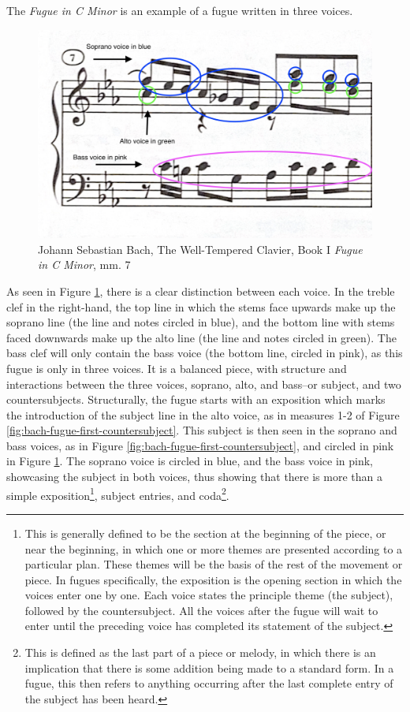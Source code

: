 The \textit{Fugue in C Minor} is an example of a fugue written in three voices.
\begin{figure}
    \centering
    \includegraphics[width=.5\textwidth]{figures/fugue-three-voices.jpg}
    \caption{Johann Sebastian Bach, The Well-Tempered Clavier, Book I \textit{Fugue in C Minor}, mm. 7}
    \label{fig:bach-fugue-three-voices}
\end{figure}
As seen in Figure \ref{fig:bach-fugue-three-voices}\autocite{Henle_2009}, there is a clear distinction between each voice. In the treble clef in the right-hand, the top line in which the stems face upwards make up the soprano line (the line and notes circled in blue), and the bottom line with stems faced downwards make up the alto line (the line and notes circled in green). The bass clef will only contain the bass voice (the bottom line, circled in pink), as this fugue is only in three voices. It is a balanced piece, with structure and interactions between the three voices, soprano, alto, and bass--or subject, and two countersubjects. Structurally, the fugue starts with an exposition which marks the introduction of the subject line in the alto voice, as in measures 1-2 of Figure \ref{fig:bach-fugue-first-countersubject}\autocite{Henle_2009}. This subject is then seen in the soprano and bass voices, as in Figure \ref{fig:bach-fugue-first-countersubject}\autocite{Henle_2009}, and circled in pink in Figure \ref{fig:bach-fugue-three-voices}\autocite{Henle_2009}. The soprano voice is circled in blue, and the bass voice in pink, showcasing the subject in both voices, thus showing that there is more than a simple exposition\footnote{This is generally defined to be the section at the beginning of the piece, or near the beginning, in which one or more themes are presented according to a particular plan. These themes will be the basis of the rest of the movement or piece. In fugues specifically, the exposition is the opening section in which the voices enter one by one. Each voice states the principle theme (the subject), followed by the countersubject. All the voices after the fugue will wait to enter until the preceding voice has completed its statement of the subject.}\autocite{Walker_2001b}, subject entries, and coda\footnote{This is defined as the last part of a piece or melody, in which there is an implication that there is some addition being made to a standard form. In a fugue, this then refers to anything occurring after the last complete entry of the subject has been heard.}\autocite{Bullivant_2001}. 

